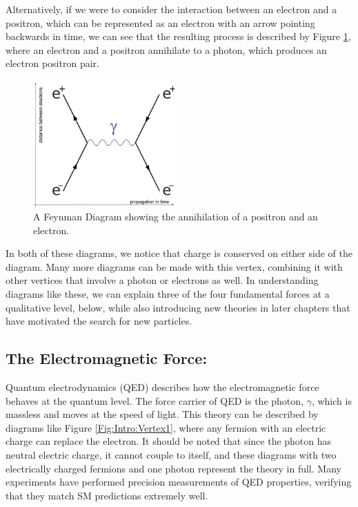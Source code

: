 Alternatively, if we were to consider the interaction between an electron and a positron, which can be represented as an electron with an arrow pointing backwards in time, we can see that the resulting process is described by Figure \ref{Fig:Intro:Feynman2}, where an electron and a positron annihilate to a photon, which produces an electron positron pair.
\begin{figure}[h]
    \centering
        \includegraphics[width=0.49\textwidth]{F1/FeynDiag2}
        \caption{A Feynman Diagram showing the annihilation of a positron and an electron.}
        \label{Fig:Intro:Feynman2}
\end{figure}
In both of these diagrams, we notice that charge is conserved on either side of the diagram. Many more diagrams can be made with this vertex, combining it with other vertices that involve a photon or electrons as well. In understanding diagrams like these, we can explain three of the four fundamental forces at a qualitative level, below, while also introducing new theories in later chapters that have motivated the search for new particles.

\subsection{The Electromagnetic Force:}
Quantum electrodynamics (QED) describes how the electromagnetic force behaves at the quantum level. The force carrier of QED is the photon, $\gamma$, which is massless and moves at the speed of light. This theory can be described by diagrams like Figure \ref{Fig:Intro:Vertex1}, where any fermion with an electric charge can replace the electron. It should be noted that since the photon has neutral electric charge, it cannot couple to itself, and these diagrams with two electrically charged fermions and one photon represent the theory in full. Many experiments have performed precision measurements of QED properties, verifying that they match SM predictions extremely well.

